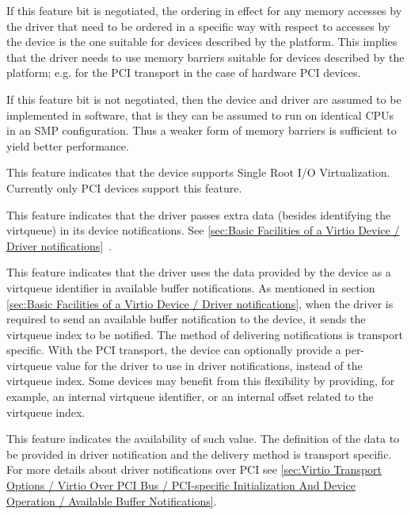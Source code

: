 \begin{description}
  If this feature bit is negotiated, the ordering in effect for any
  memory accesses by the driver that need to be ordered in a specific way
  with respect to accesses by the device is the one suitable for devices
  described by the platform. This implies that the driver needs to use
  memory barriers suitable for devices described by the platform; e.g.
  for the PCI transport in the case of hardware PCI devices.

  If this feature bit is not negotiated, then the device
  and driver are assumed to be implemented in software, that is
  they can be assumed to run on identical CPUs
  in an SMP configuration.
  Thus a weaker form of memory barriers is sufficient
  to yield better performance.
  \item[VIRTIO_F_SR_IOV(37)] This feature indicates that
  the device supports Single Root I/O Virtualization.
  Currently only PCI devices support this feature.
  \item[VIRTIO_F_NOTIFICATION_DATA(38)] This feature indicates
  that the driver passes extra data (besides identifying the virtqueue)
  in its device notifications.
  See \ref{sec:Basic Facilities of a Virtio Device / Driver notifications}~.

  \item[VIRTIO_F_NOTIF_CONFIG_DATA(39)] This feature indicates that the driver
  uses the data provided by the device as a virtqueue identifier in available
  buffer notifications.
  As mentioned in section \ref{sec:Basic Facilities of a Virtio Device / Driver notifications}, when the
  driver is required to send an available buffer notification to the device, it
  sends the virtqueue index to be notified. The method of delivering
  notifications is transport specific.
  With the PCI transport, the device can optionally provide a per-virtqueue value
  for the driver to use in driver notifications, instead of the virtqueue index.
  Some devices may benefit from this flexibility by providing, for example,
  an internal virtqueue identifier, or an internal offset related to the
  virtqueue index.

  This feature indicates the availability of such value. The definition of the
  data to be provided in driver notification and the delivery method is
  transport specific.
  For more details about driver notifications over PCI see \ref{sec:Virtio Transport Options / Virtio Over PCI Bus / PCI-specific Initialization And Device Operation / Available Buffer Notifications}.


\end{description}
